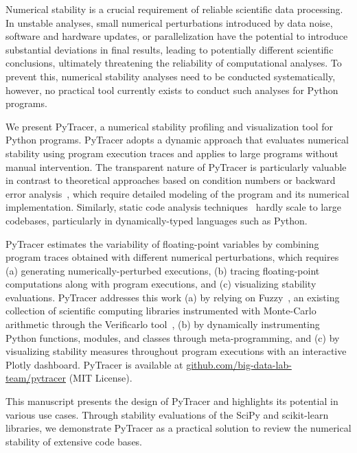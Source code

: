 \documentclass[10pt,journal,compsoc]{IEEEtran}
\newcommand{\pytracer}[0]{PyTracer\xspace}
\DeclareRobustCommand{\add}[1]{\textcolor{ao(english)}{#1}}%
\DeclareRobustCommand{\add}[1]{#1}
\begin{document}
Numerical stability is a crucial requirement of reliable scientific data
processing. In unstable analyses, small numerical perturbations introduced by
data noise, software and hardware updates, or parallelization have the potential to
introduce substantial deviations in final results, leading to potentially
different scientific conclusions, ultimately threatening the reliability of
computational analyses. To prevent this, numerical stability analyses need to be
conducted systematically, however, no practical tool currently exists to conduct
such analyses for Python programs.

We present PyTracer, a numerical stability profiling and visualization tool for
Python programs. \pytracer adopts a dynamic approach that evaluates numerical
stability using program execution traces and applies to large programs
without manual intervention. The transparent nature of \pytracer is particularly
valuable in contrast to theoretical approaches based on condition numbers or
backward error analysis~\cite{higham2002accuracy}, which require
detailed modeling of the program and its numerical implementation. Similarly,
static code analysis techniques~\cite{goubault2006static} hardly scale
to large codebases, particularly in dynamically-typed languages such as Python.

\pytracer estimates the variability of floating-point variables by
combining program traces obtained with different numerical perturbations,
which requires (a) generating numerically-perturbed
executions, (b) tracing floating-point computations along with
program executions, and (c) visualizing stability
evaluations. PyTracer addresses \add{this work} (a) by relying on
Fuzzy~\cite{kiar2020comparing}, an existing collection of scientific
computing libraries instrumented with Monte-Carlo arithmetic through the
Verificarlo tool~\cite{verificarlo}, (b) by dynamically instrumenting
Python functions, modules, and classes through meta-programming, and (c) by
visualizing stability measures throughout program executions with an
interactive Plotly dashboard. \mbox{\pytracer} is available \add{at}
\mbox{\href{https://github.com/big-data-lab-team/pytracer}{github.com/big-data-lab-team/pytracer}}
(MIT License).

This manuscript presents the design of \pytracer and highlights its potential
in various use cases. Through stability evaluations of the SciPy and
scikit-learn libraries, we demonstrate \pytracer as a practical solution to
review the numerical stability of extensive code bases. 
\end{document}
